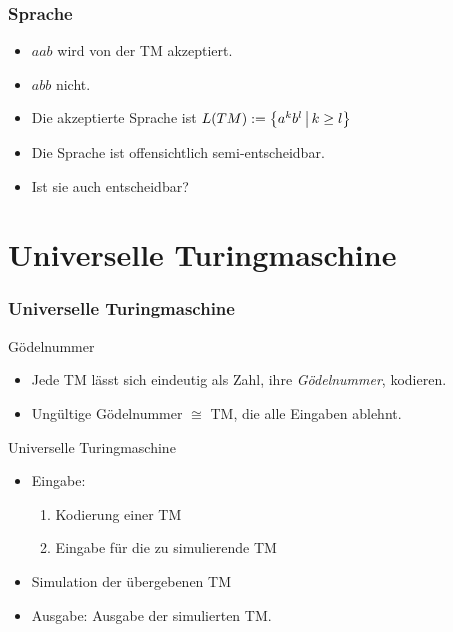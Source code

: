 \begin{frame}
 \frametitle{Sprache}
 \begin{itemize}
  \item $aab$ wird von der TM akzeptiert.
  \item $abb$ nicht.
  \item Die akzeptierte Sprache ist $L(TM) := \left\lbrace a^kb^l \,\middle\vert\, k \geq l \right\rbrace$
 
  \invincible
  \pause
  \item Die Sprache ist offensichtlich semi-entscheidbar.
  \item Ist sie auch entscheidbar?
  \vincible
 \end{itemize}
 
 \ducttape{-1cm} 

 \hfill 
 \resizebox{8cm}{!} {%
  \thetm
 }
\end{frame}



\section{Universelle Turingmaschine}
\begin{frame}
\frametitle{Universelle Turingmaschine}
\begin{block}{Gödelnummer}
\begin{itemize}
\item Jede TM lässt sich eindeutig als Zahl, ihre \emph{Gödelnummer}, kodieren.
\item Ungültige Gödelnummer $\cong$ TM, die alle Eingaben ablehnt.
\end{itemize}
\end{block}
\begin{block}{Universelle Turingmaschine}
\begin{itemize}

\item Eingabe:
\begin{enumerate}
\item Kodierung einer TM
\item Eingabe für die zu simulierende TM
\end{enumerate}
\item Simulation der übergebenen TM
\item Ausgabe: Ausgabe der simulierten TM.
\end{itemize}
\end{block}
\end{frame}

